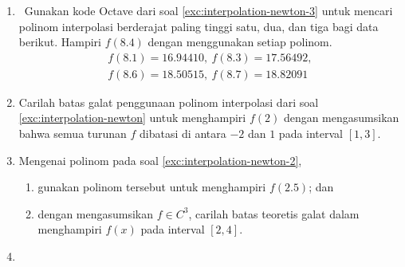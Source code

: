 \begin{small}
\begin{enumerate}
\begin{center}
\begin{tabular}{c|c}
$x$ & $f(x)$\tabularnewline
\hline 
$0.0$ & $-6.00000$\tabularnewline
$0.1$ & $-5.89483$\tabularnewline
$0.3$ & $-5.65014$\tabularnewline
$0.6$ & $-5.17788$\tabularnewline
$1.0$ & $-4.28172$\tabularnewline
\end{tabular}
\par\end{center}

Kemudian tambahkan $f(1.1)=-3.9958$ ke tabel dan hitung polinom interpolasi
berderajat paling tinggi 5 dengan menggunakan kalkulator. Anda dapat
menggunakan kode Octave untuk memeriksa pekerjaan Anda. \hasasolution 
\item \label{exc:interpolation-newton-1}\octave\ Gunakan kode Octave dari
soal \ref{exc:interpolation-newton-3} untuk mencari polinom interpolasi
berderajat paling tinggi satu, dua, dan tiga bagi data berikut. Hampiri
$f(8.4)$ dengan menggunakan setiap polinom.
\[
\begin{gathered}f(8.1)=16.94410,\ f(8.3)=17.56492,\\
f(8.6)=18.50515,\ f(8.7)=18.82091
\end{gathered}
\]
\item \label{exc:interpolation-newton-8}Carilah batas galat penggunaan
polinom interpolasi dari soal \ref{exc:interpolation-newton} untuk
menghampiri $f(2)$ dengan mengasumsikan bahwa semua turunan $f$
dibatasi di antara $-2$ dan $1$ pada interval $[1,3]$. \hasasolution 
\item Mengenai polinom pada soal \ref{exc:interpolation-newton-2},

\begin{enumerate}
\item gunakan polinom tersebut untuk menghampiri $f(2.5)$; dan
\item dengan mengasumsikan $f\in C^{3}$, carilah batas teoretis galat dalam
menghampiri $f(x)$ pada interval $[2,4]$.
\end{enumerate}
\item \label{exc:interpolation-newton-9} \hasananswer 


\end{enumerate}
\end{small}
